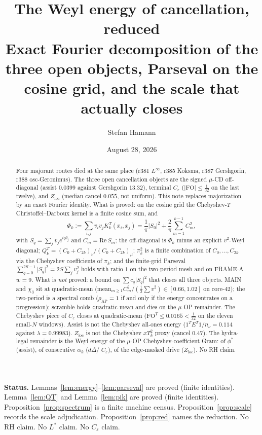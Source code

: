 \documentclass[11pt]{article}
\title{\bfseries The Weyl energy of cancellation, reduced\\[2mm]
\large Exact Fourier decomposition of the three open objects,
Parseval on the cosine grid, and the scale that actually closes}
\author{Stefan Hamann}
\date{August 28, 2026}
\theoremstyle{remark}
\begin{document}
\maketitle

\begin{abstract}\noindent
Four majorant routes died at the same place
(r381 $L^\infty$, r385 Koksma, r387 Gershgorin, r388 osc-Geronimus).
The three open cancellation objects are the signed $\mu$-CD
off-diagonal (assist $0.0399$ against Gershgorin $13.32$),
terminal $C_\varepsilon$ ($\lvert\mathrm{FO}\rvert\le\tfrac1{32}$
on the last twelve), and $Z_{\mathrm{loc}}$ (median cancel $0.055$,
not uniform).
This note replaces majorization by an exact Fourier identity.
What is proved: on the cosine grid the Chebyshev-$T$ Christoffel--Darboux
kernel is a finite cosine sum, and
\[
\Phi_k
:=
\sum_{i,j} v_i v_j K_k^T(x_i,x_j)
=
\frac1\pi\lvert S_0\rvert^2
+
\frac2\pi\sum_{m=1}^{k-1} C_m^2,
\]
with $S_q=\sum_j v_j e^{iq\theta_j}$ and $C_m=\mathrm{Re}\,S_m$;
the off-diagonal is $\Phi_k$ minus an explicit $v^2$-Weyl diagonal;
$Q_k^T=(C_0+C_{2k})_\nu/(C_0+C_{2k})_\mu$;
$\pi_k^2$ is a finite combination of $C_0,\ldots,C_{2k}$ via the
Chebyshev coefficients of $\pi_k$;
and the finite-grid Parseval
$\sum_{q=0}^{2S-1}\lvert S_q\rvert^2=2S\sum_j v_j^2$
holds with ratio $1$ on the two-period mesh and on FRAME-A $w=9$.
What is \emph{not} proved: a bound on $\sum c_q\lvert S_q\rvert^2$
that closes all three objects.
MAIN and $\chi_3$ sit at quadratic-mean
($\mathrm{mean}_{m\ge1} C_m^2\big/({\textstyle\frac12}\sum v^2)\in[0.66,1.02]$
on core-$42$);
the two-period is a spectral comb ($\rho_{\mathrm{AP}}=1$ if and only
if the energy concentrates on a progression);
scramble holds quadratic-mean and dies on the $\mu$-OP remainder.
The Chebyshev piece of $C_\varepsilon$ closes at quadratic-mean
($\mathrm{FO}^T\le0.0165<\tfrac1{32}$ on the eleven small-$N$ windows).
Assist is not the Chebyshev all-ones energy
($1^TE^T1/n_\nu=0.114$ against $\lambda=0.99983$).
$Z_{\mathrm{loc}}$ is not the Chebyshev $x T_k^2$ proxy (cancel $0.47$).
The hydra-legal remainder is the Weyl energy of the $\mu$-OP
Chebyshev-coefficient Gram: of $\phi^*$ (assist), of consecutive
$\alpha_k$ ($d\Delta$/ $C_\varepsilon$), of the edge-masked drive
($Z_{\mathrm{loc}}$).
No RH claim.
\end{abstract}

\medskip\noindent
\textbf{Status.}\enspace
Lemmas~\ref{lem:energy}--\ref{lem:parseval} are proved (finite identities).
Lemma~\ref{lem:QT} and Lemma~\ref{lem:pik} are proved (finite identities).
Proposition~\ref{prop:spectrum} is a finite machine census.
Proposition~\ref{prop:scale} records the scale adjudication.
Proposition~\ref{prop:red} names the reduction.
No RH claim.  No $L^*$ claim.  No $C_\varepsilon$ claim.
\end{document}
